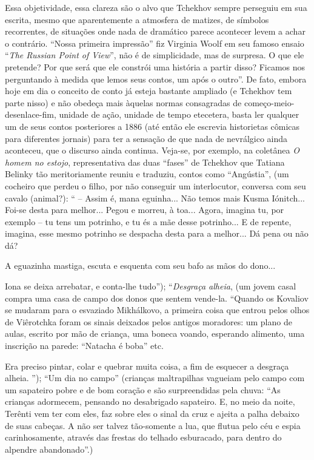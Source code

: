 Essa objetividade, essa clareza são o alvo que Tchekhov sempre perseguiu
em sua escrita, mesmo que aparentemente a atmosfera de matizes, de
símbolos recorrentes, de situações onde nada de dramático parece
acontecer levem a achar o contrário. ``Nossa primeira impressão'' fiz
Virginia Woolf em seu famoso ensaio ``\emph{The Russian Point of
View}'', não é de simplicidade, mas de surpresa. O que ele pretende? Por
que será que ele constrói uma história a partir disso? Ficamos nos
perguntando à medida que lemos seus contos, um após o outro''. De fato,
embora hoje em dia o conceito de conto já esteja bastante ampliado (e
Tchekhov tem parte nisso) e não obedeça mais àquelas normas consagradas
de começo-meio-desenlace-fim, unidade de ação, unidade de tempo
etecetera, basta ler qualquer um de seus contos posteriores a 1886 (até
então ele escrevia historietas cômicas para diferentes jornais) para ter
a sensação de que nada de nevrálgico ainda aconteceu, que o discurso
ainda continua. Veja-se, por exemplo, na coletânea \emph{O homem no
estojo}, representativa das duas ``fases'' de Tchekhov que Tatiana
Belinky tão meritoriamente reuniu e traduziu, contos como ``Angústia'',
(um cocheiro que perdeu o filho, por não conseguir um interlocutor,
conversa com seu cavalo (animal?): `` -- Assim é, mana eguinha... Não
temos mais Kusma Iónitch... Foi-se desta para melhor... Pegou e morreu,
à toa... Agora, imagina tu, por exemplo -- tu tens um potrinho, e tu és
a mãe desse potrinho... E de repente, imagina, esse mesmo potrinho se
despacha desta para a melhor... Dá pena ou não dá?

A eguazinha mastiga, escuta e esquenta com seu bafo as mãos do dono...

Iona se deixa arrebatar, e conta-lhe tudo''); ``\emph{Desgraça alheia},
(um jovem casal compra uma casa de campo dos donos que sentem vende-la.
``Quando os Kovaliov se mudaram para o esvaziado Mikhálkovo, a primeira
coisa que entrou pelos olhos de Viêrotchka foram os sinais deixados
pelos antigos moradores: um plano de aulas, escrito por mão de criança,
uma boneca voando, esperando alimento, uma inscrição na parede:
``Natacha é boba'' etc.

Era preciso pintar, colar e quebrar muita coisa, a fim de esquecer a
desgraça alheia. ''); ``Um dia no campo'' (crianças maltrapilhas
vagueiam pelo campo com um sapateiro pobre e de bom coração e são
surpreendidas pela chuva: ``As crianças adormecem, pensando no
desabrigado sapateiro. E, no meio da noite, Terênti vem ter com eles,
faz sobre eles o sinal da cruz e ajeita a palha debaixo de suas cabeças.
A não ser talvez tão-somente a lua, que flutua pelo céu e espia
carinhosamente, através das frestas do telhado esburacado, para dentro
do alpendre abandonado''.)

